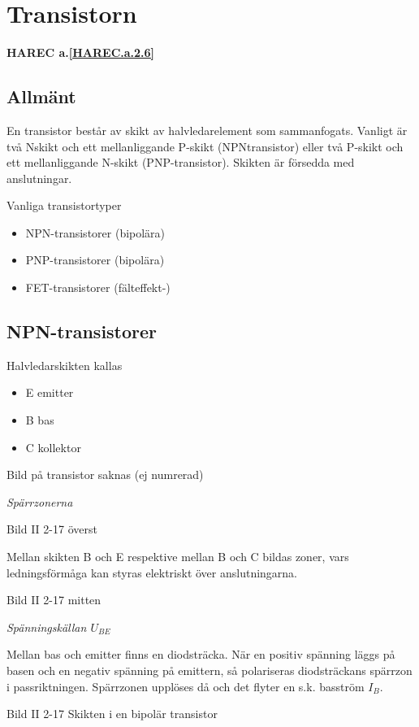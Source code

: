 \section{Transistorn}
\textbf{HAREC a.\ref{HAREC.a.2.6}\label{myHAREC.a.2.6}}

\subsection{Allmänt}

En transistor består av skikt av halvledarelement som sammanfogats. Vanligt är
två Nskikt och ett mellanliggande P-skikt (NPNtransistor) eller två P-skikt och
ett mellanliggande N-skikt (PNP-transistor). Skikten är försedda med
anslutningar.

Vanliga transistortyper
\begin{itemize}
\item NPN-transistorer (bipolära)
\item PNP-transistorer (bipolära)
\item FET-transistorer (fälteffekt-)
\end{itemize}

\subsection{NPN-transistorer}

Halvledarskikten kallas
\begin{itemize}
\item E emitter
\item B bas
\item C kollektor
\end{itemize}

Bild på transistor saknas (ej numrerad)

\emph{Spärrzonerna}

Bild II 2-17 överst

Mellan skikten B och E respektive mellan B och C bildas zoner, vars
ledningsförmåga kan styras elektriskt över anslutningarna.

Bild II 2-17 mitten

\emph{Spänningskällan \(U_{BE}\)}

Mellan bas och emitter finns en diodsträcka. När en positiv spänning läggs på
basen och en negativ spänning på emittern, så polariseras diodsträckans spärrzon
i passriktningen. Spärrzonen upplöses då och det flyter en s.k. basström
\(I_B\).

Bild II 2-17 Skikten i en bipolär transistor

